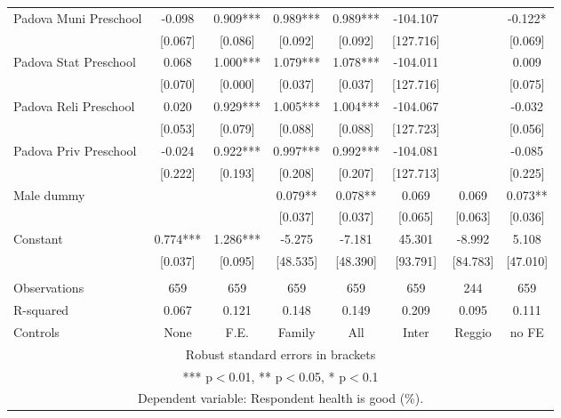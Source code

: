 \begin{tabular}{lccccccc}
Padova Muni Preschool & -0.098 & 0.909*** & 0.989*** & 0.989*** & -104.107 &  & -0.122* \\
 & [0.067] & [0.086] & [0.092] & [0.092] & [127.716] &  & [0.069] \\
Padova Stat Preschool & 0.068 & 1.000*** & 1.079*** & 1.078*** & -104.011 &  & 0.009 \\
 & [0.070] & [0.000] & [0.037] & [0.037] & [127.716] &  & [0.075] \\
Padova Reli Preschool & 0.020 & 0.929*** & 1.005*** & 1.004*** & -104.067 &  & -0.032 \\
 & [0.053] & [0.079] & [0.088] & [0.088] & [127.723] &  & [0.056] \\
Padova Priv Preschool & -0.024 & 0.922*** & 0.997*** & 0.992*** & -104.081 &  & -0.085 \\
 & [0.222] & [0.193] & [0.208] & [0.207] & [127.713] &  & [0.225] \\
Male dummy &  &  & 0.079** & 0.078** & 0.069 & 0.069 & 0.073** \\
 &  &  & [0.037] & [0.037] & [0.065] & [0.063] & [0.036] \\
Constant & 0.774*** & 1.286*** & -5.275 & -7.181 & 45.301 & -8.992 & 5.108 \\
 & [0.037] & [0.095] & [48.535] & [48.390] & [93.791] & [84.783] & [47.010] \\
 &  &  &  &  &  &  &  \\
Observations & 659 & 659 & 659 & 659 & 659 & 244 & 659 \\
R-squared & 0.067 & 0.121 & 0.148 & 0.149 & 0.209 & 0.095 & 0.111 \\
 Controls & None & F.E. & Family & All & Inter & Reggio & no FE \\ \hline
\multicolumn{8}{c}{ Robust standard errors in brackets} \\
\multicolumn{8}{c}{ *** p$<$0.01, ** p$<$0.05, * p$<$0.1} \\
\multicolumn{8}{c}{ Dependent variable: Respondent health is good (\%).} \\
\end{tabular}
